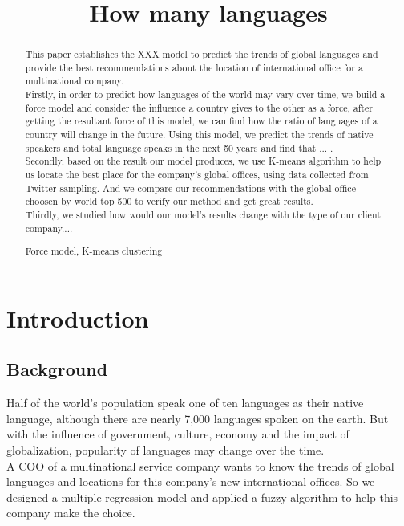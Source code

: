 \documentclass{mcmthesis}
\title {How many languages}
\date{}
\begin{document}
\begin{abstract}

  \indent This paper establishes the XXX model to predict the trends of global languages and provide the best recommendations about the location of international office for a multinational company.\\
  \indent Firstly, in order to predict how languages of the world may vary over time, we build a force model and consider the influence a country gives to the other as a force, after getting the resultant force of this model, we can find how the ratio of languages of a country will change in the future. Using this model, we predict the trends of native speakers and total language speaks in the next 50 years and find that ... .\\
  \indent Secondly, based on the result our model produces, we use K-means algorithm to help us locate the best place for the company's global offices, using data collected from Twitter sampling. And we compare our recommendations with the global office choosen by world top 500 to verify our method and get great results.\\
  \indent Thirdly, we studied how would our model's results change with the type of our client company....
\begin{keywords}
  Force model, K-means clustering
\end{keywords}
\end{abstract}
\maketitle
\pagestyle{empty}
\newpage
\tableofcontents
\newpage
\pagestyle{fancy}
\setcounter{page}{1}
\section{Introduction}
\subsection{Background}
  \indent \indent Half of the world's population speak one of ten languages as their native language, although there are nearly 7,000 languages spoken on the earth. But with the influence of government, culture, economy and the impact of globalization, popularity of languages may change over the time. \\
  \indent A COO of a multinational service company wants to know the trends of global languages and locations for this company's new international offices. So we designed a multiple regression model and applied a fuzzy algorithm to help this company make the choice.
\end{document}

